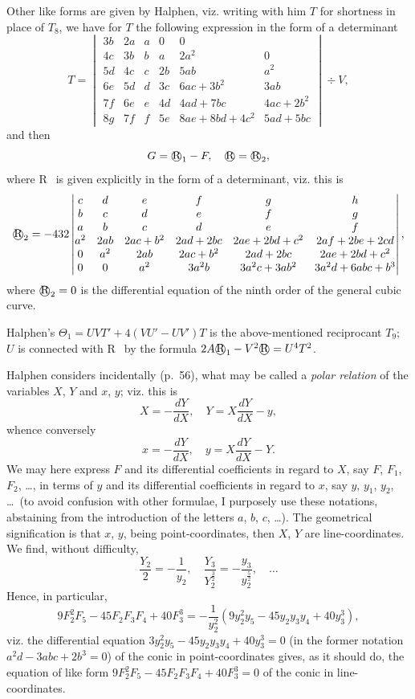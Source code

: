 \documentclass[12pt,a4paper]{article}
\theoremstyle{plain}
\begin{document}
Other like forms are given by Halphen, viz.
writing with him $T$ for shortness in place of $T_8$, we have for $T$ the following expression in the form of a determinant
\[
T = \begin{vmatrix}
3b & 2a & a & 0 & 0 \\
4c & 3b & b & a & 2a^2 & 0 \\
5d & 4c & c & 2b & 5ab & a^2 \\
6e & 5d & d & 3c & 6ac + 3b^2 & 3ab \\
7f & 6e & e & 4d & 4ad + 7bc & 4ac + 2b^2 \\
8g & 7f & f & 5e & 8ae + 8bd + 4c^2 & 5ad + 5bc
\end{vmatrix} \div V,
\]
and then
\[
G = \text{\textcircled{R}}_1 - F, \quad \text{\textcircled{R}} = \text{\textcircled{R}}_2,
\]
where \textcircled{R}\ is given explicitly in the form of a determinant, viz.
this is
\[
\text{\textcircled{R}}_2 = -432 \begin{vmatrix}
c & d & e & f & g & h \\
b & c & d & e & f & g \\
a & b & c & d & e & f \\
a^2 & 2ab & 2ac+b^2 & 2ad+2bc & 2ae+2bd+c^2 & 2af+2be+2cd \\
0 & a^2 & 2ab & 2ac+b^2 & 2ad+2bc & 2ae+2bd+c^2 \\
0 & 0 & a^2 & 3a^2b & 3a^2c+3ab^2 & 3a^2d+6abc+b^3
\end{vmatrix},
\]
where $\text{\textcircled{R}}_2 = 0$ is the differential equation of the ninth order of the general cubic curve.

Halphen's $\Theta_1 = UVT' + 4(VU' - UV')T$ is the above-mentioned reciprocant $T_9$; $U$ is connected with \textcircled{R}\ by the formula $2A\text{\textcircled{R}}_1 - V^2\text{\textcircled{R}} = U^4T^2$.

Halphen considers incidentally (p.~56), what may be called a \textit{polar relation} of the variables $X$, $Y$ and $x$, $y$; viz.
this is
\[
X = -\frac{dY}{dX}, \quad Y = X\frac{dY}{dX} - y,
\]
whence conversely
\[
x = -\frac{dY}{dX}, \quad y = X\frac{dY}{dX} - Y.
\]
We may here express $F$ and its differential coefficients in regard to $X$, say $F$, $F_1$, $F_2$, \dots, in terms of $y$ and its differential coefficients in regard to $x$, say $y$, $y_1$, $y_2$, \dots\ (to avoid confusion with other formulae, I purposely use these notations, abstaining from the introduction of the letters $a$, $b$, $c$, \dots).
The geometrical signification is that $x$, $y$, being point-coordinates, then $X$, $Y$ are line-coordinates.
We find, without difficulty,
\[
\frac{Y_2}{2} = -\frac{1}{y_2}, \quad \frac{Y_3}{Y_2^{\frac{3}{2}}} = -\frac{y_3}{y_2^{\frac{5}{2}}}, \quad \dots
\]
Hence, in particular,
\[
9F_2^2F_5 - 45F_2F_3F_4 + 40F_3^3 = -\frac{1}{y_2^2}(9y_2^2y_5 - 45y_2y_3y_4 + 40y_3^3),
\]
viz.
the differential equation $3y_2^2y_5 - 45y_2y_3y_4 + 40y_3^3 = 0$ (in the former notation $a^2d - 3abc + 2b^3 = 0$) of the conic in point-coordinates gives, as it should do, the equation of like form $9F_2^2F_5 - 45F_2F_3F_4 + 40F_3^3 = 0$ of the conic in line-coordinates.
\end{document}
